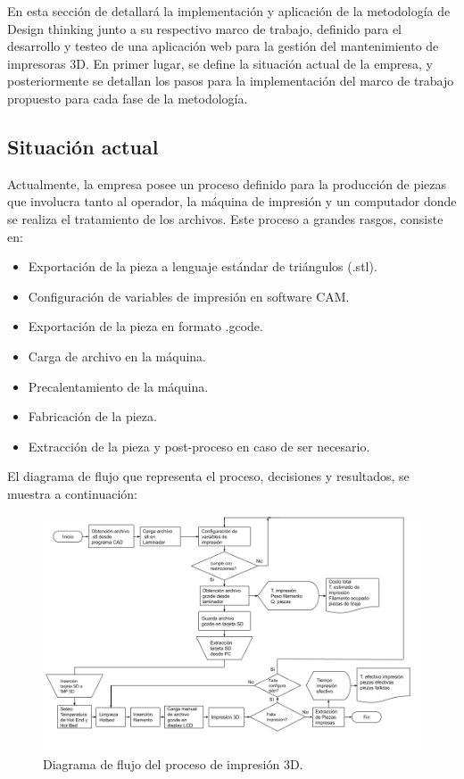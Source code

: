 En esta sección de detallará la implementación y aplicación de la metodología de Design thinking junto a su respectivo marco de trabajo, definido para el desarrollo y testeo de una aplicación web para la gestión del mantenimiento de impresoras 3D. En primer lugar, se define la situación actual de la empresa, y posteriormente se detallan los pasos para la implementación del marco de trabajo propuesto para cada fase de la metodología.

\subsection{Situación actual}

Actualmente, la empresa posee un proceso definido para la producción de piezas que involucra tanto al operador, la máquina de impresión y un computador donde se realiza el tratamiento de los archivos. Este proceso a grandes rasgos, consiste en:

\begin{itemize}
\item Exportación de la pieza a lenguaje estándar de triángulos (.stl).
\item Configuración de variables de impresión en software CAM.
\item Exportación de la pieza en formato .gcode.
\item Carga de archivo en la máquina.
\item Precalentamiento de la máquina.
\item Fabricación de la pieza.
\item Extracción de la pieza y post-proceso en caso de ser necesario.
\end{itemize}

El diagrama de flujo que representa el proceso, decisiones y resultados, se muestra a continuación:

\begin{figure}[H]
\centering
\includegraphics[scale=0.4]{images/proceso.png}
\caption{Diagrama de flujo del proceso de impresión 3D.}
\end{figure}

